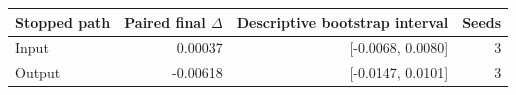 \begin{tabular}{lrrr}
\toprule
Stopped path & Paired final $\Delta$ & Descriptive bootstrap interval & Seeds \\
\midrule
Input & 0.00037 & [-0.0068, 0.0080] & 3 \\
Output & -0.00618 & [-0.0147, 0.0101] & 3 \\
\bottomrule
\end{tabular}
